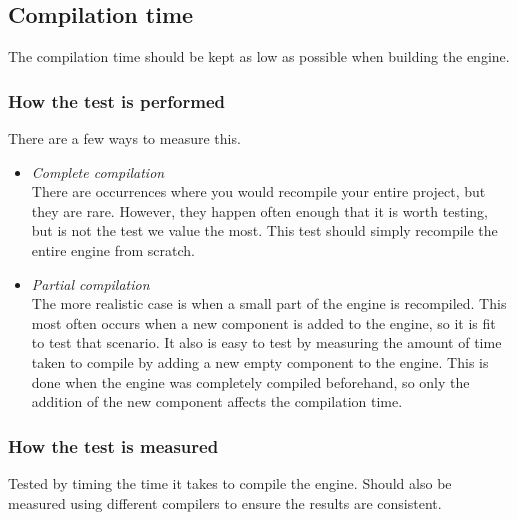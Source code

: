 \subsection{Compilation time}
The compilation time should be kept as low as possible when building the engine.


\subsubsection*{How the test is performed}
There are a few ways to measure this.

\begin{itemize}

    \item \noindent\textit{Complete compilation}\\
    There are occurrences where you would recompile your entire project, but they are rare.
    However, they happen often enough that it is worth testing, but is not the test we value the most. This test should simply recompile the entire engine from scratch.

    \item \noindent\textit{Partial compilation}\\
    The more realistic case is when a small part of the engine is recompiled.
    This most often occurs when a new component is added to the engine, so it is fit to test that scenario.
    It also is easy to test by measuring the amount of time taken to compile by adding a new empty component to the engine.
    This is done when the engine was completely compiled beforehand, so only the addition of the new component affects the compilation time.

\end{itemize}

\subsubsection*{How the test is measured}
Tested by timing the time it takes to compile the engine. Should also be measured using different compilers to ensure the results are consistent.